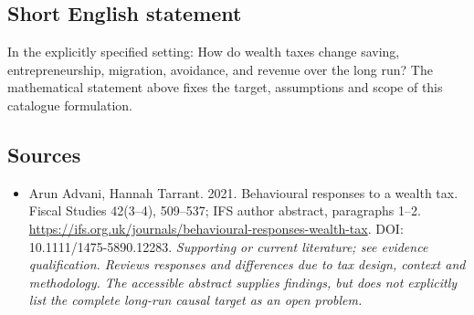 \documentclass[11pt]{article}
\begin{document}
\subsection{Short English statement}
In the explicitly specified setting: How do wealth taxes change saving, entrepreneurship, migration, avoidance, and revenue over the long run? The mathematical statement above fixes the target, assumptions and scope of this catalogue formulation.

\subsection{Sources}
\begin{itemize}\raggedright
\item[\textnormal{[S1]}]\hypertarget{source:30007754:1}{} Arun Advani, Hannah Tarrant. 2021. Behavioural responses to a wealth tax. Fiscal Studies 42(3–4), 509–537; IFS author abstract, paragraphs 1–2.
\url{https://ifs.org.uk/journals/behavioural-responses-wealth-tax}.
DOI: 10.1111/1475-5890.12283.
{\small\textit{Supporting or current literature; see evidence qualification. Reviews responses and differences due to tax design, context and methodology. The accessible abstract supplies findings, but does not explicitly list the complete long-run causal target as an open problem.}}
\end{itemize}
\end{document}
